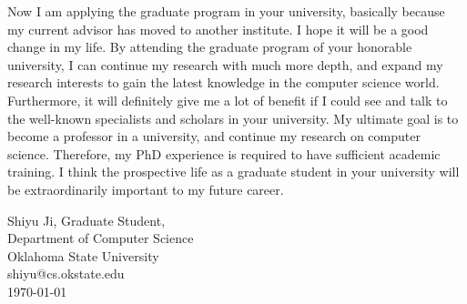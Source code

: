 \documentclass{letter}
\begin{document}
Now I am applying the graduate program in your university, basically because my current advisor has moved to another institute. I hope it will be a good change in my life. By attending the graduate program of your honorable university, I can continue my research with much more depth, and expand my research interests to gain the latest knowledge in the computer science world. Furthermore, it will definitely give me a lot of benefit if I could see and talk to the well-known specialists and scholars in your university. My ultimate goal is to become a professor in a university, and continue my research on computer science. Therefore, my PhD experience is required to have sufficient academic training. I think the prospective life as a graduate student in your university will be extraordinarily important to my future career.

Shiyu Ji, Graduate Student,\\
Department of Computer Science\\
Oklahoma State University\\
shiyu@cs.okstate.edu\\
\today{}
\end{document}
